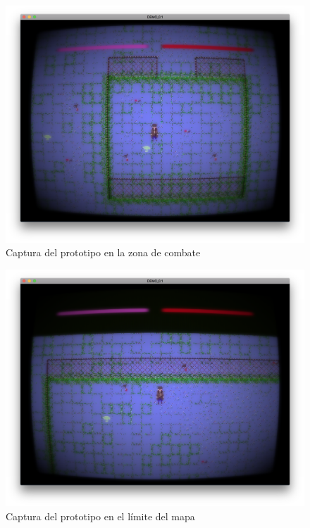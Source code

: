 \begin{figure}
	\centerline{\includegraphics[width=15cm]{otros/otrasCapturas/valla1.png}}
	\caption{Captura del prototipo en la zona de combate}
	\label{unity:combate}
\end{figure}

\begin{figure}
	\centerline{\includegraphics[width=15cm]{otros/otrasCapturas/valla2.png}}
	\caption{Captura del prototipo en el límite del mapa}
	\label{unity:limite}
\end{figure}



